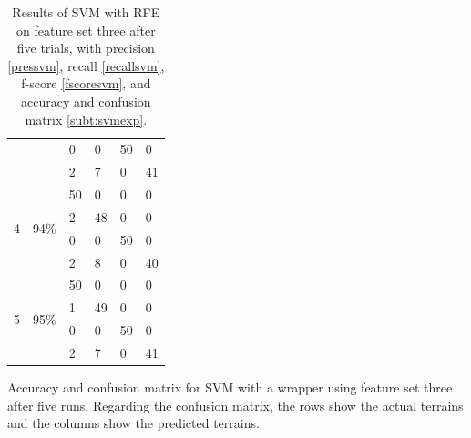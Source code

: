 \documentclass[USenglish]{ifimaster}  %
\begin{document}
\begin{table}[h]
\begin{subtable}[h]{1\textwidth}
\begin{tabular}{@{}llllll@{}}
			\multicolumn{1}{l|}{} & \multicolumn{1}{l|}{} & \multicolumn{1}{l|}{0} & \multicolumn{1}{l|}{0} & \multicolumn{1}{l|}{50} & 0 \\ \cmidrule(l){3-6} 
			\multicolumn{1}{l|}{} & \multicolumn{1}{l|}{} & \multicolumn{1}{l|}{2} & \multicolumn{1}{l|}{7} & \multicolumn{1}{l|}{0} & 41 \\ \midrule
			\multicolumn{1}{l|}{\multirow{4}{*}{4}} & \multicolumn{1}{l|}{\multirow{4}{*}{94\%}} & \multicolumn{1}{l|}{50} & \multicolumn{1}{l|}{0} & \multicolumn{1}{l|}{0} & 0 \\ \cmidrule(l){3-6} 
			\multicolumn{1}{l|}{} & \multicolumn{1}{l|}{} & \multicolumn{1}{l|}{2} & \multicolumn{1}{l|}{48} & \multicolumn{1}{l|}{0} & 0 \\ \cmidrule(l){3-6} 
			\multicolumn{1}{l|}{} & \multicolumn{1}{l|}{} & \multicolumn{1}{l|}{0} & \multicolumn{1}{l|}{0} & \multicolumn{1}{l|}{50} & 0 \\ \cmidrule(l){3-6} 
			\multicolumn{1}{l|}{} & \multicolumn{1}{l|}{} & \multicolumn{1}{l|}{2} & \multicolumn{1}{l|}{8} & \multicolumn{1}{l|}{0} & 40 \\ \midrule
			\multicolumn{1}{l|}{\multirow{4}{*}{5}} & \multicolumn{1}{l|}{\multirow{4}{*}{95\%}} & \multicolumn{1}{l|}{50} & \multicolumn{1}{l|}{0} & \multicolumn{1}{l|}{0} & 0 \\ \cmidrule(l){3-6} 
			\multicolumn{1}{l|}{} & \multicolumn{1}{l|}{} & \multicolumn{1}{l|}{1} & \multicolumn{1}{l|}{49} & \multicolumn{1}{l|}{0} & 0 \\ \cmidrule(l){3-6} 
			\multicolumn{1}{l|}{} & \multicolumn{1}{l|}{} & \multicolumn{1}{l|}{0} & \multicolumn{1}{l|}{0} & \multicolumn{1}{l|}{50} & 0 \\ \cmidrule(l){3-6} 
			\multicolumn{1}{l|}{} & \multicolumn{1}{l|}{} & \multicolumn{1}{l|}{2} & \multicolumn{1}{l|}{7} & \multicolumn{1}{l|}{0} & 41 \\ \bottomrule
		\end{tabular}
		\caption{Accuracy and confusion matrix for SVM with a wrapper using feature set three after five runs. Regarding the confusion matrix, the rows show the actual terrains and the columns show the predicted terrains.}
		\label{subt:svmexp}
	\end{subtable}
	\caption[Results of SVM on feature set three with RFE]{Results of SVM with RFE on feature set three after five trials, with precision \ref{pressvm}, recall \ref{recallsvm}, f-score \ref{fscoresvm}, and accuracy and confusion matrix \ref{subt:svmexp}.}
	\label{svmexp}
\end{table}
\FloatBarrier
\newpage
\end{document}
